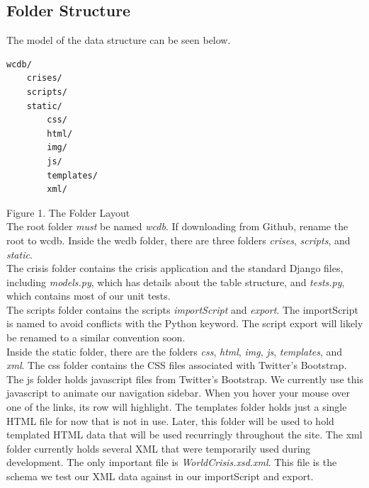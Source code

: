 \documentclass[12pt]{report}
\begin{document}
\subsection*{Folder Structure}
\hfill


The model of the data structure can be seen below.\\

\begin{lstlisting}
wcdb/
    crises/
    scripts/
    static/
        css/
        html/
        img/
        js/
        templates/
        xml/
\end{lstlisting}
\footnotesize Figure 1. The Folder Layout \normalsize
\hfill\\


The root folder \emph{must} be named \emph{wcdb}.
If downloading from Github, rename the root to wcdb.
Inside the wcdb folder, there are three folders \emph{crises}, \emph{scripts}, and \emph{static}.\\


The crisis folder contains the crisis application and the standard Django files,
including \emph{models.py}, which has details about the table structure, and \emph{tests.py}, which contains
most of our unit tests.\\


The scripts folder contains the scripts \emph{importScript} and \emph{export}.
The importScript is named to avoid conflicts with the Python keyword.
The script export will likely be renamed to a similar convention soon.\\


Inside the static folder, there are the folders \emph{css}, \emph{html}, \emph{img}, \emph{js}, \emph{templates}, and \emph{xml}.
The css folder contains the CSS files associated with Twitter's Bootstrap.\\


The js folder holds javascript files from Twitter's Bootstrap.
We currently use this javascript to animate our navigation sidebar.
When you hover your mouse over one of the links, its row will highlight.
The templates folder holds just a single HTML file for now that is not in use.
Later, this folder will be used to hold templated HTML data that will be used recurringly throughout the site.
The xml folder currently holds several XML that were temporarily used during development.
The only important file is \emph{WorldCrisis.xsd.xml}.
This file is the schema we test our XML data against in our importScript and export.\\
\end{document}
